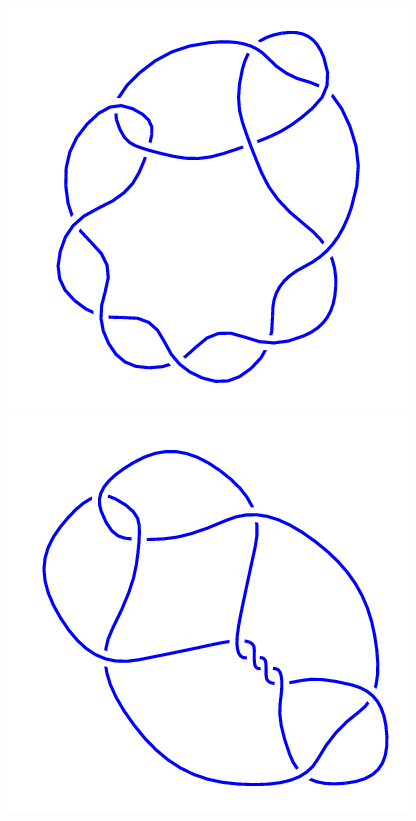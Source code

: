 \begin{figure}[H]
\begin{minipage}[b]{.18\linewidth}
	\end{minipage}
	\begin{minipage}[b]{.18\linewidth}
		\centering
		\includegraphics[width=\linewidth]{../data/10_34.png}
	\end{minipage}
	\begin{minipage}[b]{.18\linewidth}
		\centering
		\includegraphics[width=\linewidth]{../data/10_35.png}

\end{minipage}
\end{figure}
